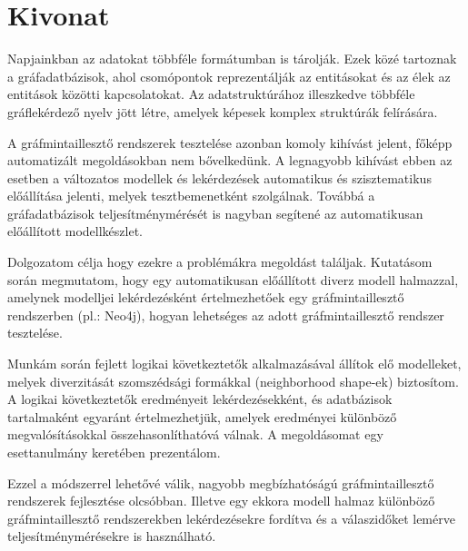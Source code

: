 \setcounter{page}{1}

\selecthungarian

\chapter*{Kivonat}

Napjainkban az adatokat többféle formátumban is tárolják. Ezek közé tartoznak a gráfadatbázisok, ahol  csomópontok reprezentálják az entitásokat és az élek az entitások közötti kapcsolatokat. Az adatstruktúrához illeszkedve többféle gráflekérdező nyelv jött létre, amelyek képesek komplex struktúrák felírására.

A gráfmintaillesztő rendszerek tesztelése azonban komoly kihívást jelent, főképp automatizált megoldásokban nem bővelkedünk. A legnagyobb kihívást ebben az esetben a változatos modellek és lekérdezések automatikus és szisztematikus előállítása jelenti, melyek tesztbemenetként szolgálnak. Továbbá a gráfadatbázisok teljesítménymérését is nagyban segítené az automatikusan előállított modellkészlet.

Dolgozatom célja hogy ezekre a problémákra megoldást találjak. Kutatásom során   megmutatom, hogy egy automatikusan előállított diverz modell halmazzal, amelynek modelljei lekérdezésként értelmezhetőek egy gráfmintaillesztő rendszerben (pl.: Neo4j), hogyan lehetséges  az adott gráfmintaillesztő rendszer tesztelése.

Munkám során fejlett logikai következtetők alkalmazásával állítok elő modelleket, melyek diverzitását szomszédsági formákkal (neighborhood shape-ek) biztosítom. A logikai következtetők eredményeit lekérdezésekként, és adatbázisok tartalmaként egyaránt értelmezhetjük, amelyek eredményei különböző megvalósításokkal összehasonlíthatóvá válnak. A megoldásomat egy esettanulmány keretében prezentálom.

Ezzel a módszerrel lehetővé válik, nagyobb megbízhatóságú gráfmintaillesztő rendszerek fejlesztése olcsóbban. Illetve egy ekkora modell halmaz különböző gráfmintaillesztő rendszerekben lekérdezésekre fordítva és a válaszidőket lemérve teljesítménymérésekre is használható.



\vfill
\selectenglish


